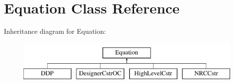 \hypertarget{class_open_chams_1_1_equation}{}\section{Equation Class Reference}
\label{class_open_chams_1_1_equation}
Inheritance diagram for Equation\+:\begin{figure}[H]
\begin{center}
\leavevmode
\includegraphics[height=2.000000cm]{class_open_chams_1_1_equation}
\end{center}
\end{figure}
